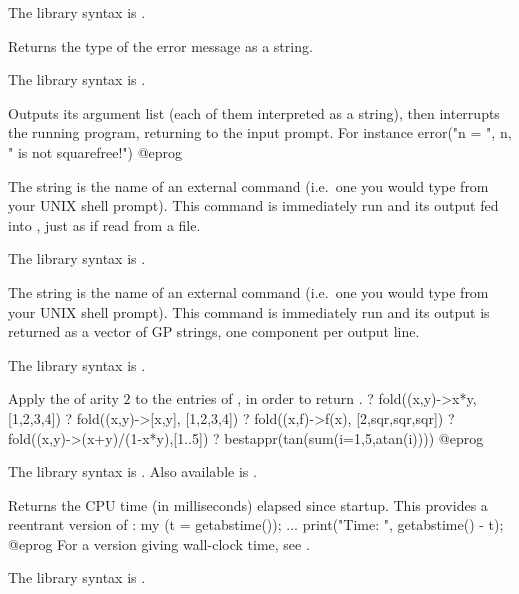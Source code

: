 The library syntax is .

\label{se:errname}
Returns the type of the error message  as a string.

The library syntax is .

\label{se:error}
Outputs its argument list (each of
them interpreted as a string), then interrupts the running  program,
returning to the input prompt. For instance
\bprog
error("n = ", n, " is not squarefree!")
@eprog\noindent

\label{se:extern}
The string  is the name of an external command (i.e.~one you
would type from your UNIX shell prompt). This command is immediately run and
its output fed into , just as if read from a file.

The library syntax is .

\label{se:externstr}
The string  is the name of an external command (i.e.~one you
would type from your UNIX shell prompt). This command is immediately run and
its output is returned as a vector of GP strings, one component per output
line.

The library syntax is .

\label{se:fold}
Apply the   of arity $2$ to the entries of ,
in order to return .
\bprog
? fold((x,y)->x*y, [1,2,3,4])
? fold((x,y)->[x,y], [1,2,3,4])
? fold((x,f)->f(x), [2,sqr,sqr,sqr])
? fold((x,y)->(x+y)/(1-x*y),[1..5])
? bestappr(tan(sum(i=1,5,atan(i))))
@eprog

The library syntax is .
Also available is
.

\label{se:getabstime}
Returns the CPU time (in milliseconds) elapsed since  startup.
This provides a reentrant version of :
\bprog
my (t = getabstime());
...
print("Time: ", getabstime() - t);
@eprog
For a version giving wall-clock time, see .

The library syntax is .

